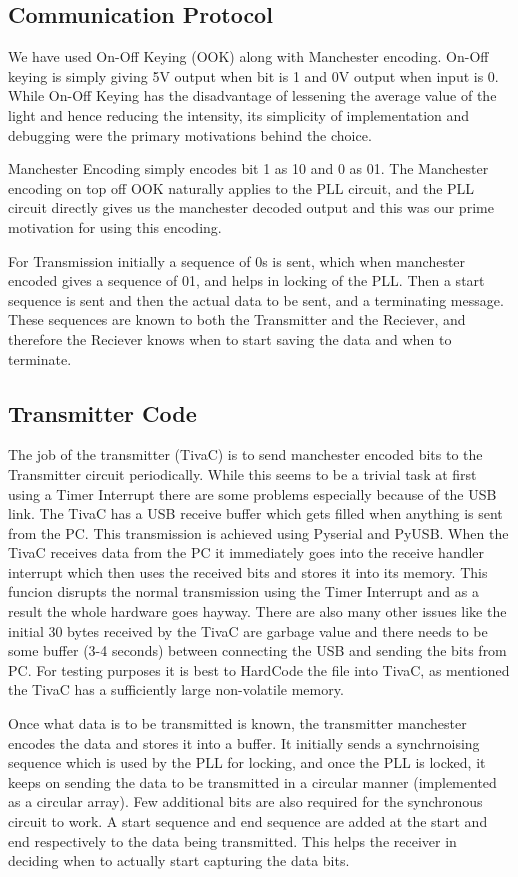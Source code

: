 \documentclass{article}
\begin{document}
\subsection{Communication Protocol}
We have used On-Off Keying (OOK) along with Manchester encoding. On-Off keying is simply giving 5V output when bit is 1 and 0V output when input is 0. While On-Off Keying has the disadvantage of lessening the average value of the light and hence reducing the intensity, its simplicity of implementation and debugging were the primary motivations behind the choice.

Manchester Encoding simply encodes bit 1 as 10 and 0 as 01. The Manchester encoding on top off OOK naturally applies to the PLL circuit, and the PLL circuit directly gives us the manchester decoded output and this was our prime motivation for using this encoding.

For Transmission initially a sequence of 0s is sent, which when manchester encoded gives a sequence of 01, and helps in locking of the PLL. Then a start sequence is sent and then the actual data to be sent, and a terminating message. These sequences are known to both the Transmitter and the Reciever, and therefore the Reciever knows when to start saving the data and when to terminate. 

\subsection{Transmitter Code}
The job of the transmitter (TivaC) is to send manchester encoded bits to the Transmitter circuit periodically. While this seems to be a trivial task at first using a Timer Interrupt there are some problems especially because of the USB link. The TivaC has a USB receive buffer which gets filled when anything is sent from the PC. This transmission is achieved using Pyserial and PyUSB. When the TivaC receives data from the PC it immediately goes into the receive handler interrupt which then uses the received bits and stores it into its memory. This funcion disrupts the normal transmission using the Timer Interrupt and as a result the whole hardware goes hayway. There are also many other issues like the initial 30 bytes received by the TivaC are garbage value and there needs to be some buffer (3-4 seconds) between connecting the USB and sending the bits from PC. For testing purposes it is best to HardCode the file into TivaC, as mentioned the TivaC has a sufficiently large non-volatile memory.

Once what data is to be transmitted is known, the transmitter manchester encodes the data and stores it into a buffer. It initially sends a synchrnoising sequence which is used by the PLL for locking, and once the PLL is locked, it keeps on sending the data to be transmitted in a circular manner (implemented as a circular array). Few additional bits are also required for the synchronous circuit to work. A start sequence and end sequence are added at the start and end respectively to the data being transmitted. This helps the receiver in deciding when to actually start capturing the data bits. 
\end{document}
